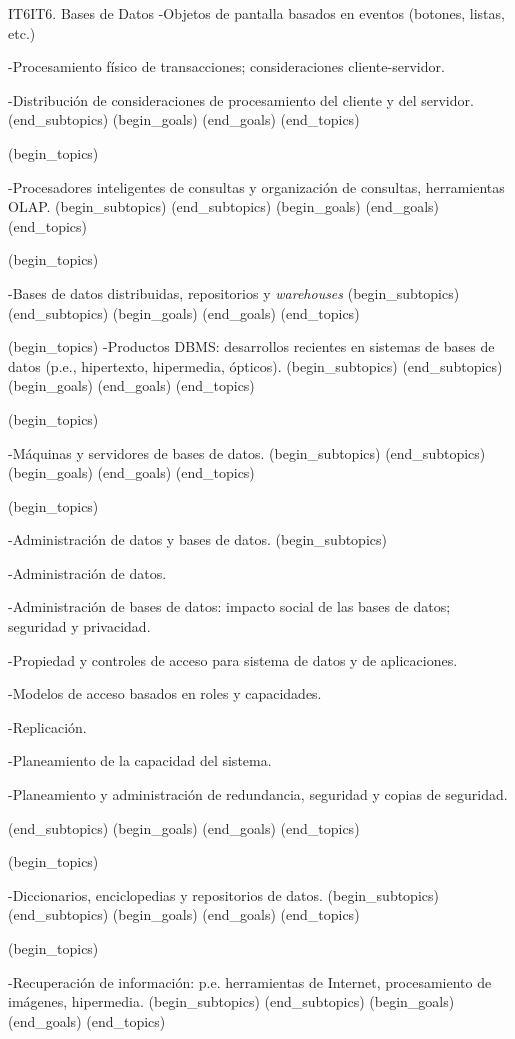\begin{BKL2}{IT6}{IT6. Bases de Datos}
-Objetos de pantalla basados en eventos (botones, listas, etc.)

-Procesamiento físico de transacciones; consideraciones cliente-servidor.

-Distribución de consideraciones de procesamiento del cliente y del servidor.
(end_subtopics)
(begin_goals)
(end_goals)
(end_topics)

 

(begin_topics)

-Procesadores inteligentes de consultas y organización de consultas, herramientas OLAP.
(begin_subtopics)
(end_subtopics)
(begin_goals)
(end_goals)
(end_topics)

 

(begin_topics)

-Bases de datos distribuidas, repositorios y {\it warehouses}
(begin_subtopics)
(end_subtopics)
(begin_goals)
(end_goals)
(end_topics)

 

(begin_topics)
-Productos DBMS: desarrollos recientes en sistemas de bases de datos (p.e., hipertexto, hipermedia, ópticos).
(begin_subtopics)
(end_subtopics)
(begin_goals)
(end_goals)
(end_topics)

 

(begin_topics)

-Máquinas y servidores de bases de datos.
(begin_subtopics)
(end_subtopics)
(begin_goals)
(end_goals)
(end_topics)

 

(begin_topics)

-Administración de datos y bases de datos.
(begin_subtopics)

-Administración de datos.

-Administración de bases de datos: impacto social de las bases de datos; seguridad y privacidad.

-Propiedad y controles de acceso para sistema de datos y de aplicaciones.

-Modelos de acceso basados en roles y capacidades.

-Replicación.

-Planeamiento de la capacidad del sistema.

-Planeamiento y administración de redundancia, seguridad y copias de seguridad.

(end_subtopics)
(begin_goals)
(end_goals)
(end_topics)

 

(begin_topics)

-Diccionarios, enciclopedias y repositorios de datos.
(begin_subtopics)
(end_subtopics)
(begin_goals)
(end_goals)
(end_topics)

 

(begin_topics)

-Recuperación de información: p.e. herramientas de Internet, procesamiento de imágenes, hipermedia.
(begin_subtopics)
(end_subtopics)
(begin_goals)
(end_goals)
(end_topics)

\end{BKL2}



